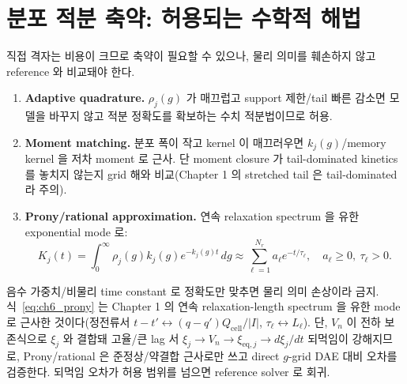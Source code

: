 \documentclass[11pt,a4paper]{article}
\newcommand{\eq}{\mathrm{eq}}
\newcommand{\cell}{\mathrm{cell}}
\begin{document}
\section{분포 적분 축약: 허용되는 수학적 해법}\label{sec:ch6_reduction}
직접 격자는 비용이 크므로 축약이 필요할 수 있으나, 물리 의미를 훼손하지 않고 reference 와 비교돼야 한다.
\begin{enumerate}[label=\textbf{(\alph*)},leftmargin=2.4em]
\item \textbf{Adaptive quadrature.} $\rho_j(g)$ 가 매끄럽고 support 제한/tail 빠른 감소면 모델을 바꾸지 않고
  적분 정확도를 확보하는 수치 적분법이므로 허용.
\item \textbf{Moment matching.} 분포 폭이 작고 kernel 이 매끄러우면 $k_j(g)$/memory kernel 을 저차 moment 로
  근사. 단 moment closure 가 tail-dominated kinetics 를 놓치지 않는지 grid 해와 비교(Chapter 1 의 stretched
  tail 은 tail-dominated 라 주의).
\item \textbf{Prony/rational approximation.} 연속 relaxation spectrum 을 유한 exponential mode 로:
\begin{equation}
K_j(t)=\int_0^\infty\rho_j(g)k_j(g)e^{-k_j(g)t}\,dg\approx\sum_{\ell=1}^{N_r}a_\ell e^{-t/\tau_\ell},\quad a_\ell\ge0,\ \tau_\ell>0.
\label{eq:ch6_prony}
\end{equation}
\end{enumerate}
음수 가중치/비물리 time constant 로 정확도만 맞추면 물리 의미 손상이라 금지. 식~\eqref{eq:ch6_prony} 는
Chapter 1 의 연속 relaxation-length spectrum 을 유한 mode 로 근사한 것이다(정전류서 $t-t'\leftrightarrow
(q-q')Q_\cell/|I|$, $\tau_\ell\leftrightarrow L_\ell$). 단, $V_n$ 이 전하 보존식으로 $\xi_j$ 와 결합돼
고율/큰 lag 서 $\xi_j\to V_n\to\xi_{\eq,j}\to d\xi_j/dt$ 되먹임이 강해지므로, Prony/rational 은 준정상/약결합
근사로만 쓰고 direct $g$-grid DAE 대비 오차를 검증한다. 되먹임 오차가 허용 범위를 넘으면 reference solver 로 회귀.

\end{document}
